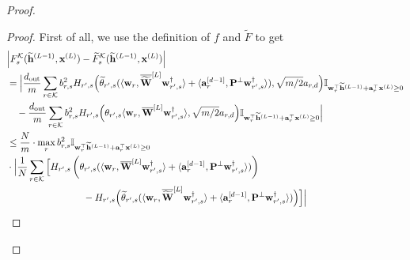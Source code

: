 \begin{claim}
\begin{proof}
				\begin{proof}
					First of all, we use the definition of $f$ and $\widetilde{F}$ to get
					\begin{align} &\abs{F^{\mathcal{K}}_s(\widetilde{\mathbf{h}}^{(L-1)}, \mathbf{x}^{(L)}) - \widetilde{F}^{\mathcal{K}}_s(\widetilde{\mathbf{h}}^{(L-1)}, \mathbf{x}^{(L)})} \nonumber
						\\&
						= \Big|\frac{d_{\mathrm{out}} }{m} \sum_{r \in \mathcal{K}} b_{r, s}^2 H_{r', s}\Big(\widetilde{\theta}_{r', s} (\langle \mathbf{w}_{r}, \overline{\widetilde{\mathbf{W}}}^{[L]} \mathbf{w}_{r', s}^{\dagger}\rangle + \langle \mathbf{a}_{r}^{[d-1]},  \mathbf{P}^{\perp}\mathbf{w}_{r', s}^{\dagger}  \rangle), \sqrt{m/2} a_{r, d} \Big) \mathbb{I}_{\mathbf{w}_r^{\top} \widetilde{\mathbf{h}}^{(L-1)} + \mathbf{a}_r^{\top} \mathbf{x}^{(L)} \ge 0} \nonumber\\&
						\quad - \frac{d_{\mathrm{out}} }{m} \sum_{r \in \mathcal{K}} b_{r, s}^2 H_{r', s}\Big(\theta_{r', s} \langle \mathbf{w}_{r}, \overline{\mathbf{W}}^{[L]} \mathbf{w}_{r', s}^{\dagger}\rangle, \sqrt{m/2} a_{r, d}\Big) \mathbb{I}_{\mathbf{w}_r^{\top} \widetilde{\mathbf{h}}^{(L-1)} + \mathbf{a}_r^{\top} \mathbf{x}^{(L)} \ge 0}\Big| \nonumber\\&
						\le \frac{N}{m} \cdot \max_{r} b^{2}_{r, s} \mathbb{I}_{\mathbf{w}_r^{\top} \widetilde{\mathbf{h}}^{(L-1)} + \mathbf{a}_r^{\top} \mathbf{x}^{(L)} \ge 0}  \nonumber\\& \cdot \Big|\frac{1}{N}\sum_{r 
							\in \mathcal{K}} \Big[ H_{r', s}\left(\theta_{r', s} (\langle \mathbf{w}_{r}, \overline{\mathbf{W}}^{[L]} \mathbf{w}_{r', s}^{\dagger}\rangle + \langle \mathbf{a}_{r}^{[d-1]},  \mathbf{P}^{\perp}\mathbf{w}_{r', s}^{\dagger}  \rangle)\right) \nonumber\\&\quad\quad\quad\quad\quad\quad\quad\quad
						- H_{r', s}\Big(\widetilde{\theta}_{r', s} (\langle \mathbf{w}_{r}, \overline{\widetilde{\mathbf{W}}}^{[L]} \mathbf{w}_{r', s}^{\dagger}\rangle + \langle \mathbf{a}_{r}^{[d-1]},  \mathbf{P}^{\perp}\mathbf{w}_{r', s}^{\dagger}  \rangle)\Big)\Big]\Big| \label{eq:diff_f_tildef}
					\end{align}
					

\end{proof}
\end{proof}
\end{claim}
